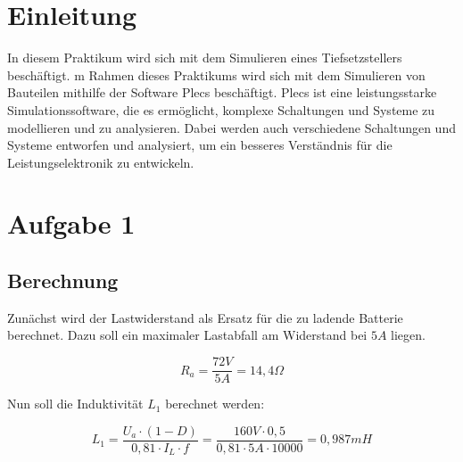 \documentclass{report}
\begin{document}

\newpage

\tableofcontents

\listoffigures

\newpage

\section{Einleitung}

In diesem Praktikum wird sich mit dem Simulieren eines Tiefsetzstellers beschäftigt. m Rahmen dieses Praktikums wird sich mit dem Simulieren von Bauteilen mithilfe der Software Plecs beschäftigt. Plecs ist eine leistungsstarke Simulationssoftware, die es ermöglicht, komplexe Schaltungen und Systeme zu modellieren und zu analysieren. Dabei werden auch verschiedene Schaltungen und Systeme entworfen und analysiert, um ein besseres Verständnis für die Leistungselektronik zu entwickeln.

\section{Aufgabe 1}
\subsection{Berechnung}
Zunächst wird der Lastwiderstand als Ersatz für die zu ladende Batterie berechnet. Dazu soll ein maximaler Lastabfall am Widerstand bei $5A$ liegen.


\begin{equation}
  R_{a} = \frac{72V}{5A} = 14,4\Omega
  \label{eq:Lastwiderstand}
\end{equation}

Nun soll die Induktivität $L_1$ berechnet werden:
  
\begin{equation}
  L_1 = \frac{U_a \cdot (1-D)}{0,81 \cdot I_L \cdot f} = \frac{160V \cdot 0,5}{0,81 \cdot 5A \cdot 10000} = 0,987mH
  \label{eq:induk}
\end{equation}
\end{document}
